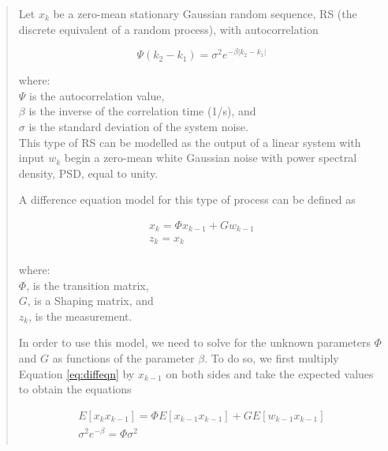 \documentclass[11pt,letterpaper]{article}
\begin{document}
\begin{quote}

Let $x_k$ be a zero-mean stationary Gaussian random sequence, RS (the discrete equivalent of a random process), with autocorrelation

\begin{equation} \label{eq:autocorr}
\Psi(k_2-k_1) = \sigma^2 e^{- \beta |k_2-k_1| }
\end{equation}

where: \\
$\Psi$ is the autocorrelation value, \\
$\beta$ is the inverse of the correlation time (1/s), and \\
$\sigma$ is the standard deviation of the system noise. \\

This type of RS can be modelled as the output of a linear system with input $w_k$ begin a zero-mean white Gaussian noise with power spectral density, PSD,
equal to unity.

A difference equation model for this type of process can be defined as

\begin{equation} \label{eq:diffeqn}
\begin{array}{l}
x_k = \Phi x_{k-1} + G w_{k-1} \\
z_k = x_k \\
\end{array}
\end{equation}

where: \\
$\Phi$, is the transition matrix, \\
$G$, is a Shaping matrix, and \\
$z_k$, is the measurement.

In order to use this model, we need to solve for the unknown parameters $\Phi$ and $G$ as functions of the parameter $\beta$. To do so, we first multiply
Equation \ref{eq:diffeqn} by $x_{k-1}$ on both sides and take the expected values to obtain the equations

\begin{equation} \label{eq:expvalue}
\begin{array}{l}
E[x_k x_{k-1}] = \Phi E[x_{k-1} x_{k-1}] + G E[ w_{k-1} x_{k-1} ] \\
\sigma^2 e^{-\beta} = \Phi \sigma^2 \\
\end{array}
\end{equation}


\end{quote}
\end{document}
